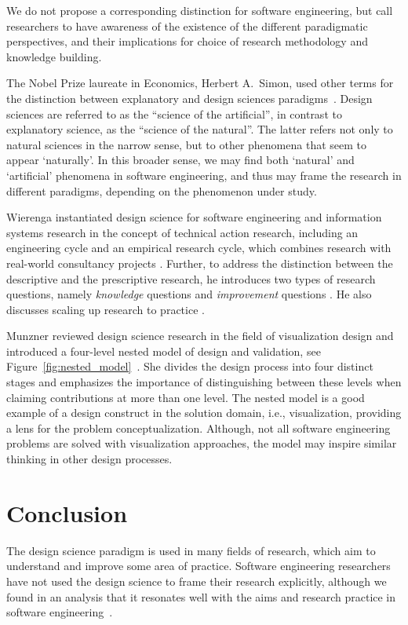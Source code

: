 \documentclass[graybox]{svmult}
\begin{document}
We do not propose a corresponding distinction for software engineering, but call researchers to have awareness of the existence of the different paradigmatic perspectives, and their implications for choice of research methodology and knowledge building.

The Nobel Prize laureate in Economics, Herbert A.\ Simon, used other terms for the distinction between explanatory and design sciences paradigms~\cite{Simons69}. Design sciences are referred to as the ``science of the artificial'', in contrast to explanatory science, as the ``science of the natural''. The latter refers not only to natural sciences in the narrow sense, but to other phenomena that seem to appear `naturally'. In this broader sense, we may find both `natural' and `artificial' phenomena in software engineering, and thus may frame the research in different paradigms, depending on the phenomenon under study. 


Wierenga instantiated design science for software engineering and information systems research in the concept of technical action research, including an engineering cycle and an empirical research cycle, which combines research with real-world consultancy projects \cite{wieringa_six_2015,wieringa_technical_2012,wieringa_what_2014}. Further, to address the distinction between the descriptive and the prescriptive research, he introduces two types of research questions, namely \emph{knowledge} questions and \emph{improvement} questions \cite{wieringa_design_2009}. He also discusses scaling up research to practice \cite{Wieringa2014}. 

Munzner reviewed design science research in the field of visualization design and introduced a four-level nested model of design and validation, see Figure~\ref{fig:nested_model}~\cite{munzner2009}. She divides the design process into four distinct stages and emphasizes the importance of distinguishing between these levels when claiming contributions at more than one level. The nested model is a good example of a design construct in the solution domain, i.e., visualization, providing a lens for the problem conceptualization. Although, not all software engineering problems are solved with visualization approaches, the model may inspire similar thinking in other design processes. 


\section{Conclusion}
\label{sec:conclusion}
The design science paradigm is used in many fields of research, which aim to understand and improve some area of practice. Software engineering researchers have not used the design science to frame their research explicitly, although we found in an analysis that it resonates well with the aims and research practice in software engineering~\cite{Engstrom19arxiv}. 
\end{document}
